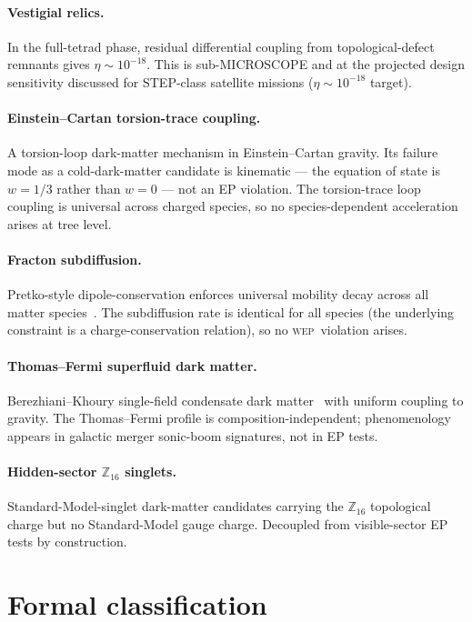 \documentclass[twocolumn]{revtex4-2}
\newcommand{\WEP}{\textsc{wep}}
\begin{document}
\paragraph*{Vestigial relics.}
In the full-tetrad phase, residual differential coupling from
topological-defect remnants gives $\eta \sim 10^{-18}$. This is
sub-MICROSCOPE and at the projected design sensitivity discussed for
STEP-class satellite missions ($\eta \sim 10^{-18}$ target).

\paragraph*{Einstein--Cartan torsion-trace coupling.}
A torsion-loop dark-matter mechanism in Einstein--Cartan gravity. Its
failure mode as a cold-dark-matter candidate is kinematic ---
the equation of state is $w = 1/3$ rather than $w = 0$ --- not an
EP violation. The torsion-trace loop coupling is universal across
charged species, so no species-dependent acceleration arises at tree
level.

\paragraph*{Fracton subdiffusion.}
Pretko-style dipole-conservation enforces universal mobility decay
across all matter species~\cite{Pretko2017}. The subdiffusion rate is
identical for all species (the underlying constraint is a
charge-conservation relation), so no \WEP\ violation arises.

\paragraph*{Thomas--Fermi superfluid dark matter.}
Berezhiani--Khoury single-field condensate dark
matter~\cite{Berezhiani2015} with uniform coupling to gravity. The
Thomas--Fermi profile is composition-independent; phenomenology
appears in galactic merger sonic-boom signatures, not in EP tests.

\paragraph*{Hidden-sector $\mathbb{Z}_{16}$ singlets.}
Standard-Model-singlet dark-matter candidates carrying the
$\mathbb{Z}_{16}$ topological charge but no Standard-Model gauge
charge. Decoupled from visible-sector EP tests by construction.

\section{Formal classification}
\label{sec:lean}
\end{document}
